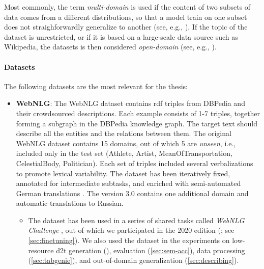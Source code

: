 {Most commonly, the term \emph{multi-domain} is used if the content of two subsets of data comes from a different distributions, so that a model train on one subset does not straighforwardly generalize to another (see, e.g., \citealp{vanderleeCACAPODatasetMultilingual2020,budzianowskiMultiWOZLargeScaleMultiDomain2020,rastogiScalableMultiDomainConversational2020}). If the topic of the dataset is unrestricted, or if it is based on a large-scale data source such as Wikipedia, the datasets is then considered \emph{open-domain} (see, e.g., \citealp{chenLogicalNaturalLanguage2020,nan2021dart,kann2022open}).

\paragraph{Datasets} The following datasets are the most relevant for the thesis:

\begin{itemize}
  \item \textbf{WebNLG}: The WebNLG dataset \cite{gardentCreatingTrainingCorpora2017,gardentWebNLGChallengeGenerating2017} contains \ac{rdf} triples from DBPedia \cite{auer2007dbpedia} and their crowdsourced descriptions. Each example consists of 1-7 triples, together forming a subgraph in the DBPedia knowledge graph. The target text should describe all the entities and the relations between them. The original WebNLG dataset \cite{gardentCreatingTrainingCorpora2017} contains 15 domains, out of which 5 are \emph{unseen}, i.e., included only in the test set (Athlete, Artist, MeanOfTransportation, CelestialBody, Politician). Each set of triples included several verbalizations to promote lexical variability. The dataset has been iteratively fixed, annotated for intermediate subtasks, and enriched with semi-automated German translations \cite{castroferreiraEnrichingWebNLGCorpus2018}. The version 3.0 \cite{ferreira20202020} contains one additional domain and automatic translations to Russian.
        \begin{itemize}
          \item
                The dataset has been used in a series of shared tasks called \emph{WebNLG Challenge} \cite{gardentWebNLGChallengeGenerating2017,shimorinaWebNLGChallengeHuman2019,ferreira20202020,cripwell2023WebNLGShared2023}, out of which we participated in the 2020 edition (\citealp{ferreira20202020}; see \autoref{sec:finetuning}). We also used the dataset in the experiments on low-resource \ac{d2t} generation (), evaluation (\autoref{sec:sem-acc}), data processing (\autoref{sec:tabgenie}), and out-of-domain generalization (\autoref{sec:describing}).
        \end{itemize}


\end{itemize}}

